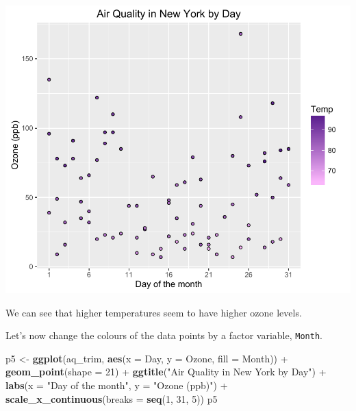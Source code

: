 \documentclass[]{article}
\newenvironment{Shaded}{\begin{snugshade}}{\end{snugshade}}
\newcommand{\KeywordTok}[1]{\textcolor[rgb]{0.13,0.29,0.53}{\textbf{{#1}}}}
\newcommand{\DataTypeTok}[1]{\textcolor[rgb]{0.13,0.29,0.53}{{#1}}}
\newcommand{\DecValTok}[1]{\textcolor[rgb]{0.00,0.00,0.81}{{#1}}}
\newcommand{\StringTok}[1]{\textcolor[rgb]{0.31,0.60,0.02}{{#1}}}
\newcommand{\NormalTok}[1]{{#1}}
\begin{document}
\begin{center}\includegraphics{5_Scatter_Plots_pdf/scatter_8-1} \end{center}

We can see that higher temperatures seem to have higher ozone levels.

Let's now change the colours of the data points by a factor variable,
\texttt{Month}.

\begin{Shaded}
\begin{Highlighting}[]
\NormalTok{p5 <-}\StringTok{ }\KeywordTok{ggplot}\NormalTok{(aq_trim, }\KeywordTok{aes}\NormalTok{(}\DataTypeTok{x =} \NormalTok{Day, }\DataTypeTok{y =} \NormalTok{Ozone, }\DataTypeTok{fill =} \NormalTok{Month)) +}\StringTok{ }
\StringTok{  }\KeywordTok{geom_point}\NormalTok{(}\DataTypeTok{shape =} \DecValTok{21}\NormalTok{) +}
\StringTok{  }\KeywordTok{ggtitle}\NormalTok{(}\StringTok{"Air Quality in New York by Day"}\NormalTok{) +}\StringTok{ }
\StringTok{  }\KeywordTok{labs}\NormalTok{(}\DataTypeTok{x =} \StringTok{"Day of the month"}\NormalTok{, }\DataTypeTok{y =} \StringTok{"Ozone (ppb)"}\NormalTok{) +}
\StringTok{  }\KeywordTok{scale_x_continuous}\NormalTok{(}\DataTypeTok{breaks =} \KeywordTok{seq}\NormalTok{(}\DecValTok{1}\NormalTok{, }\DecValTok{31}\NormalTok{, }\DecValTok{5}\NormalTok{))}
\NormalTok{p5}
\end{Highlighting}
\end{Shaded}
\end{document}
